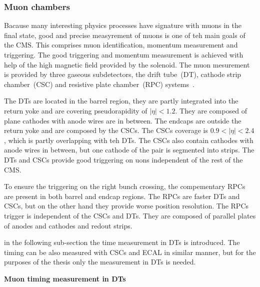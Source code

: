 \subsubsection{Muon chambers}

Bacause many interesting physics processes have signature with muons in the final state, good and precise measyrement of muons is one of teh main goals of the CMS. This comprises muon identification, momentum measurement and triggering. The good triggering and momentum measurement is achieved with help of the high magnetic field provided by the solenoid. The muon mesurement is provided by three gaseous subdetectors, the drift tube~(DT), cathode strip chamber~(CSC) and resistive plate chamber~(RPC) systems~\cite{tdrMuon}.

The DTs are located in the barrel region, they are partly integrated into the return yoke and are covering pseudorapidity of $|\eta|<1.2$. They are composed of plane cathodes with anode wires are in between. The endcaps are outside the return yoke and are composed by the CSCs. The CSCs coverage is $0.9<|\eta|<2.4$, which is partly overlapping with teh DTs. The CSCs also contain cathodes with anode wires in between, but one cathode of the pair is segmented into strips. The DTs and CSCs provide good triggering on uons independent of the rest of the CMS.

To ensure the triggering on the right bunch crossing, the compementary RPCs are present in both barrel and endcap regions. The RPCs are faster DTs and CSCs, but on the other hand they provide worse position resolution. The RPCs trigger is independent of the CSCs and DTs. They are composed of parallel plates of anodes and cathodes and redout strips. 

in the following sub-section the time measurement in DTs is introduced. The timing can be also measured with CSCs and ECAL in similar manner, but for the purposes of the thesis only the measurement in DTs is needed.

\textbf{Muon timing measurement in DTs}

